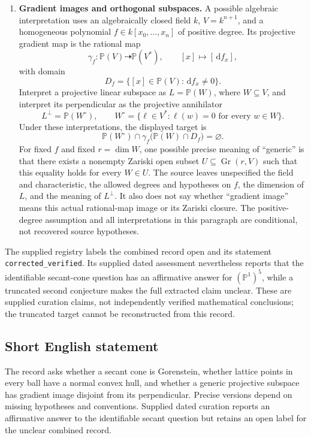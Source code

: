 \documentclass[11pt]{article}
\newcommand{\PP}{\mathbb{P}}
\newcommand{\dd}{\,\mathrm{d}}
\begin{document}
\begin{enumerate}
\item \textbf{Gradient images and orthogonal subspaces.} A possible algebraic interpretation uses an algebraically closed field \(k\), \(V=k^{n+1}\), and a homogeneous polynomial \(f\in k[x_0,\ldots,x_n]\) of positive degree. Its projective gradient map is the rational map
\[
\gamma_f:\PP(V)\dashrightarrow\PP(V^*),\qquad
[x]\longmapsto[\dd f_x],
\]
with domain
\[
D_f=\{[x]\in\PP(V):\dd f_x\ne0\}.
\]
Interpret a projective linear subspace as \(L=\PP(W)\), where \(W\subseteq V\), and interpret its perpendicular as the projective annihilator
\[
L^\perp=\PP(W^\circ),\qquad
W^\circ=\{\ell\in V^*: \ell(w)=0\text{ for every }w\in W\}.
\]
Under these interpretations, the displayed target is
\[
\PP(W^\circ)\cap\gamma_f\bigl(\PP(W)\cap D_f\bigr)=\varnothing.
\]
For fixed \(f\) and fixed \(r=\dim W\), one possible precise meaning of ``generic'' is that there exists a nonempty Zariski open subset \(U\subseteq\operatorname{Gr}(r,V)\) such that this equality holds for every \(W\in U\). The source leaves unspecified the field and characteristic, the allowed degrees and hypotheses on \(f\), the dimension of \(L\), and the meaning of \(L^\perp\). It also does not say whether ``gradient image'' means this actual rational-map image or its Zariski closure. The positive-degree assumption and all interpretations in this paragraph are conditional, not recovered source hypotheses.
\end{enumerate}

The supplied registry labels the combined record open and its statement \texttt{corrected\_verified}. Its supplied dated assessment nevertheless reports that the identifiable secant-cone question has an affirmative answer for \((\PP^1)^5\), while a truncated second conjecture makes the full extracted claim unclear. These are supplied curation claims, not independently verified mathematical conclusions; the truncated target cannot be reconstructed from this record.
\subsection{Short English statement}
The record asks whether a secant cone is Gorenstein, whether lattice points in every ball have a normal convex hull, and whether a generic projective subspace has gradient image disjoint from its perpendicular. Precise versions depend on missing hypotheses and conventions. Supplied dated curation reports an affirmative answer to the identifiable secant question but retains an open label for the unclear combined record.
\end{document}
